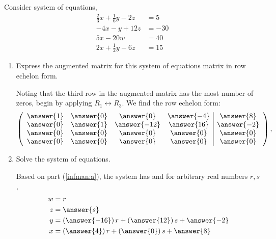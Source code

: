 \documentclass{ximera}
\author{Parisa Fatheddin}
\begin{document}
\begin{exercise} Consider system of equations,
\begin{align*}
\frac{2}{3}x + \frac{1}{6}y -2z &= 5\\
-4x -y+12z &= -30\\
5x-20w &= 40\\
2x+\frac{1}{2} y - 6z &= 15
\end{align*}

\begin{enumerate}
\item\label{infman:a} Express the augmented matrix for this system of equations matrix
  in row echelon form.
\begin{prompt}
Noting that the third row in the augmented matrix has the most number
of zeros, begin by applying $R_{1}\leftrightarrow R_{3}$. We find the
row echelon form:
\[
\left(\begin{array}{cccc|c}
  \answer{1} &  \answer{0} & \answer{0} & \answer{-4} &\answer{8} \\
  \answer{0} &  \answer{1} & \answer{-12} & \answer{16} &\answer{-2}\\
  \answer{0} &  \answer{0} & \answer{0} & \answer{0} &\answer{0}\\
  \answer{0} &  \answer{0} & \answer{0} & \answer{0} &\answer{0}
\end{array}\right),
\]
\end{prompt}
\item Solve the system of equations. 
\begin{prompt}
Based on part (\ref{infman:a}), the system has  and for arbitrary real numbers $r,s$,
\begin{align*}
w&= r\\
z &= \answer{s}\\
y &= \left(\answer{-16}\right)r + \left(\answer{12}\right)s + \answer{-2}\\
x&= \left(\answer{4}\right) r + \left(\answer{0}\right)s + \answer{8}
\end{align*}
\end{prompt}
\end{enumerate}
\end{exercise}
\end{document}

